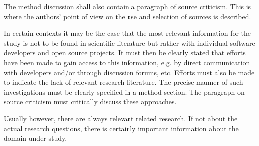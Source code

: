 The method discussion shall also contain a paragraph of
source criticism. This is where the authors’ point of view on
the use and selection of sources is described.

In certain contexts it may be the case that the most relevant
information for the study is not to be found in scientific
literature but rather with individual software developers and
open source projects. It must then be clearly stated that
efforts have been made to gain access to this information,
e.g. by direct communication with developers and/or through
discussion forums, etc. Efforts must also be made to indicate
the lack of relevant research literature. The precise manner
of such investigations must be clearly specified in a method
section. The paragraph on source criticism must critically
discuss these approaches.

Usually however, there are always relevant related research.
If not about the actual research questions, there is certainly
important information about the domain under study.
